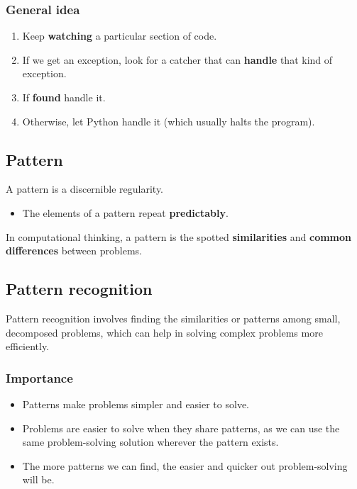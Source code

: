 \documentclass[11pt]{article}
\begin{document}
\subsubsection{General idea}
\label{sec:orgca5f88b}
\begin{enumerate}
\item Keep \textbf{watching} a particular section of code.
\item If we get an exception, look for a catcher that can \textbf{handle} that kind of exception.
\item If \textbf{found} handle it.
\item Otherwise, let Python handle it (which usually halts the program).
\end{enumerate}

\subsection{Pattern}
\label{sec:org9c0eb3e}
A pattern is a discernible regularity.
\begin{itemize}
\item The elements of a pattern repeat \textbf{predictably}.
\end{itemize}

In computational thinking, a pattern is the spotted \textbf{similarities} and \textbf{common differences} between problems.

\subsection{Pattern recognition}
\label{sec:orgcd62ecc}
Pattern recognition involves finding the similarities or patterns among small, decomposed problems, which can help in solving complex problems more efficiently.

\subsubsection{Importance}
\label{sec:org791cb68}
\begin{itemize}
\item Patterns make problems simpler and easier to solve.
\item Problems are easier to solve when they share patterns, as we can use the same problem-solving solution wherever the pattern exists.
\item The more patterns we can find, the easier and quicker out problem-solving will be.
\end{itemize}
\end{document}
